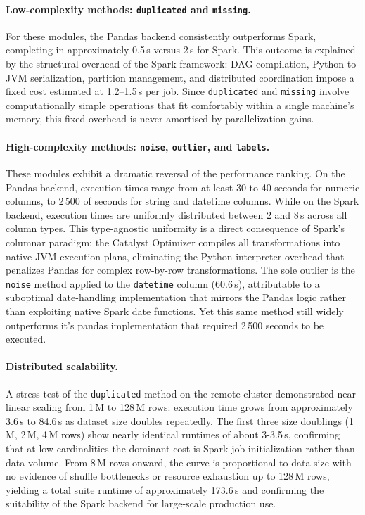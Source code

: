 \documentclass{article}
\begin{document}
\paragraph{Low-complexity methods: \texttt{duplicated} and \texttt{missing}.}
For these modules, the Pandas backend consistently outperforms Spark, completing in approximately 0.5\,s versus 2\,s for Spark. This outcome is explained by the structural overhead of the Spark framework: DAG compilation, Python-to-JVM serialization, partition management, and distributed coordination impose a fixed cost estimated at 1.2--1.5\,s per job. Since \texttt{duplicated} and \texttt{missing} involve computationally simple operations that fit comfortably within a single machine's memory, this fixed overhead is never amortised by parallelization gains.

\paragraph{High-complexity methods: \texttt{noise}, \texttt{outlier}, and \texttt{labels}.}
These modules exhibit a dramatic reversal of the performance ranking. On the Pandas backend, execution times range from at least 30 to 40 seconds for numeric columns, to 2\,500 of seconds for string and datetime columns. While on the Spark backend, execution times are uniformly distributed between 2 and 8\,s across all column types. This type-agnostic uniformity is a direct consequence of Spark's columnar paradigm: the Catalyst Optimizer compiles all transformations into native JVM execution plans, eliminating the Python-interpreter overhead that penalizes Pandas for complex row-by-row transformations. The sole outlier is the \texttt{noise} method applied to the \texttt{datetime} column (60.6\,s), attributable to a suboptimal date-handling implementation that mirrors the Pandas logic rather than exploiting native Spark date functions. Yet this same method still widely outperforms it's pandas implementation that required 2\,500 seconds to be executed.

\paragraph{Distributed scalability.}
A stress test of the \texttt{duplicated} method on the remote cluster demonstrated near-linear scaling from 1\,M to 128\,M rows: execution time grows from approximately 3.6\,s to 84.6\,s as dataset size doubles repeatedly. The first three size doublings (1\,M, 2\,M, 4\,M rows) show nearly identical runtimes of about 3-3.5\,s, confirming that at low cardinalities the dominant cost is Spark job initialization rather than data volume. From 8\,M rows onward, the curve is proportional to data size with no evidence of shuffle bottlenecks or resource exhaustion up to 128\,M rows, yielding a total suite runtime of approximately 173.6\,s and confirming the suitability of the Spark backend for large-scale production use.
\end{document}
